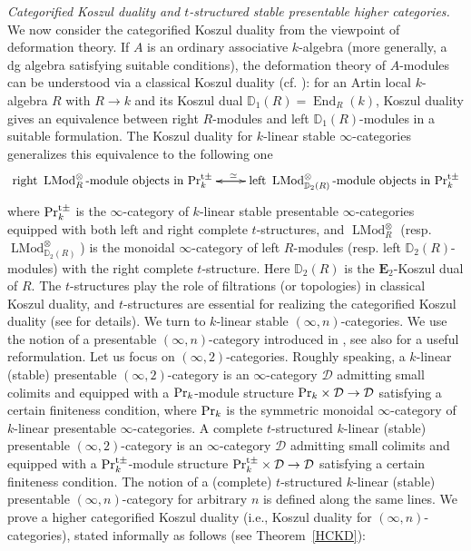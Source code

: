 \documentclass[leqno,12pt]{amsart}
\theoremstyle{plain}
\theoremstyle{definition}
\newcommand{\DD}{\mathbb{D}}
\newcommand{\DDD}{\mathcal{D}}
\newcommand{\PR}{\textup{Pr}}
\newcommand{\PRTTT}{\textup{Pr}^{\textup{t}\pm}}
\newcommand{\End}{\operatorname{End}}
\newcommand{\etwo}{\mathbf{E}_2}
\newcommand{\LMod}{\operatorname{LMod}}
\begin{document}
{\it Categorified Koszul duality and $t$-structured stable presentable higher categories.}
We now consider the categorified Koszul duality from the viewpoint of deformation theory.
If $A$ is an ordinary associative $k$-algebra (more generally, a dg algebra satisfying suitable conditions),
the deformation theory of $A$-modules can be understood via a classical Koszul duality (cf. \cite[X, Section 5.2]{DAG}):
for an Artin local $k$-algebra $R$ with $R\to k$ and its Koszul dual $\DD_1(R)=\End_{R}(k)$, Koszul duality gives
an equivalence between right $R$-modules and left $\DD_1(R)$-modules in a suitable formulation.
The Koszul duality for $k$-linear stable $\infty$-categories generalizes this equivalence to
the following one
\[
\xymatrix{
\textup{right}\ \LMod_{R}^\otimes\textup{-module objects in}\ \PRTTT_k \ar[r]^(0.5){\simeq} & \textup{left}\ \LMod_{\DD_2(R)}^\otimes\textup{-module objects in}\ \PRTTT_k  \ar[l]
}
\]
where $\PRTTT_k$ is the $\infty$-category of $k$-linear stable presentable $\infty$-categories equipped with both left and right complete $t$-structures,
and $\LMod_R^\otimes$ (resp. $\LMod_{\DD_2(R)}^\otimes$) is the monoidal $\infty$-category of left $R$-modules (resp. left $\DD_2(R)$-modules)
with the right complete $t$-structure. Here $\DD_2(R)$ is the $\etwo$-Koszul dual of $R$.
The $t$-structures play the role of filtrations (or topologies) in classical Koszul duality, and $t$-structures are essential for realizing
the categorified Koszul duality (see \cite{IH} for details).
We turn to $k$-linear stable $(\infty,n)$-categories. We use the notion of a presentable $(\infty,n)$-category introduced in \cite{Ste}, 
see also \cite{Ao} for a useful reformulation. Let us focus on $(\infty,2)$-categories.
Roughly speaking, a $k$-linear (stable) presentable $(\infty,2)$-category is an $\infty$-category $\DDD$ admitting small colimits and equipped with
a $\PR_k$-module structure $\PR_k\times \DDD\to \DDD$ satisfying a certain finiteness condition, where $\PR_k$ is the symmetric monoidal $\infty$-category of $k$-linear presentable $\infty$-categories.
A complete $t$-structured $k$-linear (stable) presentable $(\infty,2)$-category is an $\infty$-category $\DDD$ admitting small colimits and equipped with a $\PRTTT_k$-module structure $\PRTTT_k\times \DDD\to \DDD$ satisfying a certain finiteness condition.
The notion of a (complete) $t$-structured $k$-linear (stable) presentable $(\infty,n)$-category for arbitrary $n$ is defined along the same lines.
We prove
a higher categorified Koszul duality (i.e., Koszul duality for $(\infty,n)$-categories), stated informally as follows (see Theorem~\ref{HCKD}):
\end{document}
